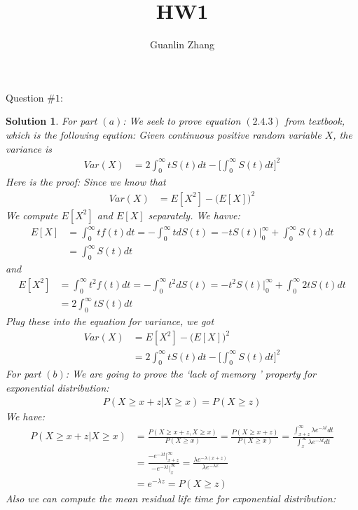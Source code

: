 \documentclass[11pt]{article}
\title{HW1}
\author{Guanlin Zhang}
\newtheorem{sol}{Solution}
\begin{document}
Question $\# 1$:
\begin{sol}
	For part $(a)$:\vskip 2mm
	We seek to prove equation $(2.4.3)$ from textbook, which is the following eqution:\vskip 2mm
	Given continuous positive random variable $X$, the variance is
	\begin{align*}
		Var(X) &= 2\int_0^{\infty}t S(t) dt - \Big[\int_0^{\infty}S(t) d t\Big]^2
	\end{align*}
	Here is the proof:\vskip 2mm
	Since we know that
	\begin{align*}
		Var(X) &= E[X^2] - \Big(E[X]\Big)^2
	\end{align*}
	We compute $E[X^2]$ and $E[X]$ separately.\vskip 2mm
	We havve:
	\begin{align*}
		E[X] &= \int_0^{\infty} t f(t) d t = -\int_0^{\infty}t dS(t) = -tS(t)\Big\vert_0^{\infty} + \int_0^{\infty}S(t)d t\\
		&= \int_0^{\infty}S(t)d t
	\end{align*}
	and
	\begin{align*}
		E[X^2] &= \int_0^{\infty}t^2 f(t)dt = -\int_0^{\infty}t^2d S(t) = -t^2S(t)\Big\vert_0^{\infty} + \int_0^{\infty}2t S(t) dt\\
		&= 2\int_0^{\infty} t S(t)d t 
	\end{align*}
	Plug these into the equation for variance, we got
	\begin{align*}
		Var(X) &= E[X^2] - \Big(E[X]\Big)^2\\
		&= 2\int_0^{\infty}t S(t) dt - \Big[\int_0^{\infty}S(t) d t\Big]^2
	\end{align*}
	For part $(b)$:\vskip 2mm
	We are going to prove the `lack of memory ' property for exponential distribution:
	\begin{align*}
		P(X \geq x + z| X \geq x) = P(X \geq z)
	\end{align*}
	We have:
	\begin{align*}
		P(X \geq x + z| X \geq x) &= \frac{P(X \geq x + z, X \geq x)}{P(X \geq x)} = \frac{P(X \geq x + z)}{P(X \geq x)} = \frac{\int_{x + z}^{\infty}\lambda e^{-\lambda t} d t}{\int_{x}^{\infty}\lambda e^{-\lambda t}d t}\\
		&= \frac{-e^{-\lambda t}\Big\vert_{x + z}^{\infty}}{-e^{-\lambda t}\Big\vert_{x}^{\infty}}= \frac{\lambda e^{-\lambda(x + z)}}{\lambda e^{-\lambda x}}\\
		&= e^{-\lambda z} = P(X \geq z)
	\end{align*}
	Also we can compute the mean residual life time for exponential distribution:
	\begin{align*}

\end{align*}
\end{sol}
\end{document}

